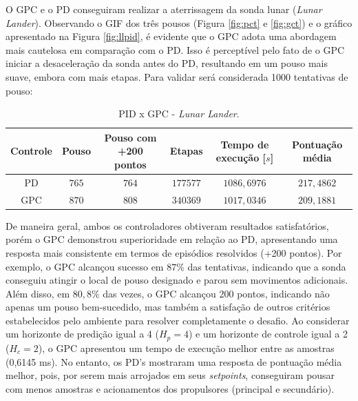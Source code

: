 \documentclass[12pt,           %
a4paper,                       %
openany,                       %
oneside,                       %
chapter=TITLE,                 %
english,                       %
spanish,                       %
brazil,                        %
sumario=tradicional]{abntex2}  %
\begin{document}
\begin{OnehalfSpace}
O GPC e o PD conseguiram realizar a aterrissagem da sonda lunar (\textit{Lunar Lander}). Observando o GIF dos três pousos (Figura \ref{fig:pct} e \ref{fig:gct}) e o gráfico apresentado na Figura \ref{fig:llpid}, é evidente que o GPC adota uma abordagem mais cautelosa em comparação com o PD. Isso é perceptível pelo fato de o GPC iniciar a desaceleração da sonda antes do PD, resultando em um pouso mais suave, embora com mais etapas. Para validar será considerada 1000 tentativas de pouso:

\begin{table}[H]
	\centering
	\vspace*{-.2cm}
	\caption{PID x GPC - \textit{Lunar Lander}.}
	\begin{tabular}{|c|c|c|c|c|c|}
            \hline
             Controle & Pouso & Pouso com +200 pontos & Etapas & Tempo de execução [$s$] & Pontuação média\\
            \hline
            PD & $765$ & $764$ &  $177577$ & $1086,6976$ & $217,4862$\\
            \hline
            GPC & $870$ & $808$  &  $340369$ & $1017,0346$ & $209,1881$\\ 
            \hline
	\end{tabular}  
    \label{tab:intll}                 %
\end{table}
\vspace*{-0.7cm}
{\raggedright {}}

De maneira geral, ambos os controladores obtiveram resultados satisfatórios, porém o GPC demonstrou superioridade em relação ao PD, apresentando uma resposta mais consistente em termos de episódios resolvidos (+200 pontos). Por exemplo, o GPC alcançou sucesso em $87\%$ das tentativas, indicando que a sonda conseguiu atingir o local de pouso designado e parou sem movimentos adicionais. Além disso, em $80,8\%$ das vezes, o GPC alcançou 200 pontos, indicando não apenas um pouso bem-sucedido, mas também a satisfação de outros critérios estabelecidos pelo ambiente para resolver completamente o desafio. Ao considerar um horizonte de predição igual a 4 ($H_p=4$) e um horizonte de controle igual a 2 ($H_c=2$), o GPC apresentou um tempo de execução melhor entre as amostras (0,6145 ms). No entanto, os PD's mostraram uma resposta de pontuação média melhor, pois, por serem mais arrojados em seus \textit{setpoints}, conseguiram pousar com menos amostras e acionamentos dos propulsores (principal e secundário).


\end{OnehalfSpace}
\end{document}
